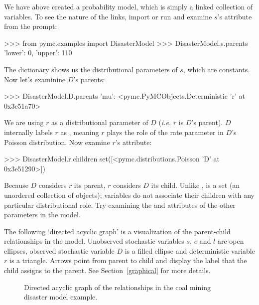 \documentclass[]{jss}
\begin{document}
We have above created a  probability model, which is simply a linked collection of variables. To see the nature of the links, import or run  and examine $s$'s  attribute from the  prompt:
\begin{CodeInput}
>>> from pymc.examples import DisasterModel
>>> DisasterModel.s.parents
{'lower': 0, 'upper': 110}
\end{CodeInput}
The  dictionary shows us the distributional parameters of $s$, which are constants. Now let's examinine $D$'s parents:
\begin{CodeInput}
>>> DisasterModel.D.parents
{'mu': <pymc.PyMCObjects.Deterministic 'r' at 0x3e51a70>}
\end{CodeInput}
We are using $r$ as a distributional parameter of $D$ (\emph{i.e.} $r$ is $D$'s parent). $D$ internally labels $r$ as , meaning $r$ plays the role of the rate parameter in $D$'s Poisson distribution. Now examine $r$'s  attribute:
\begin{CodeInput}
>>> DisasterModel.r.children
set([<pymc.distributions.Poisson 'D' at 0x3e51290>])
\end{CodeInput}
Because $D$ considers $r$ its parent, $r$ considers $D$ its child. Unlike ,  is a set (an unordered collection of objects); variables do not associate their children with any particular distributional role. Try examining the  and  attributes of the other parameters in the model.

The following `directed acyclic graph' is a visualization of the parent-child relationships in the model. Unobserved stochastic variables $s$, $e$ and $l$ are open ellipses, observed stochastic variable $D$ is a filled ellipse and deterministic variable $r$ is a triangle. Arrows point from parent to child and display the label that the child assigns to the parent. See Section~\ref{graphical} for more details.
\begin{figure}[h!]
\begin{center}
   \caption{Directed acyclic graph of the relationships in the coal mining disaster model example.}
\end{center}
\end{figure}
\end{document}
